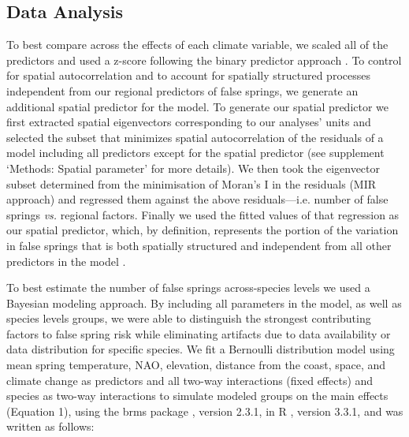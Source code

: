 \documentclass{article}\usepackage[]{graphicx}\usepackage[]{color}
\begin{document}
\subsection*{Data Analysis}
To best compare across the effects of each climate variable, we scaled all of the predictors and used a z-score following the binary predictor approach \citep{Gelman2006}. To control for spatial autocorrelation and to account for spatially structured processes independent from our regional predictors of false springs, we generate an additional spatial predictor for the model. To generate our spatial predictor we first extracted spatial eigenvectors corresponding to our analyses' units and selected the subset that minimizes spatial autocorrelation of the residuals of a model including all predictors except for the spatial predictor \citep{diniz2012selection,Baumen2017} (see supplement `Methods: Spatial parameter' for more details). We then took the eigenvector subset determined from the minimisation of Moran's I in the residuals (MIR approach) and regressed them against the above residuals---i.e. number of false springs \emph{vs.} regional factors. Finally we used the fitted values of that regression as our spatial predictor, which, by definition, represents the portion of the variation in false springs that is both spatially structured and independent from all other predictors in the model \citep[e.g. average spring temperature, altitude, etc.][]{griffith2006spatial,morales2012imprint}. %


To best estimate the number of false springs across-species levels we used a Bayesian modeling approach. By including all parameters in the model, as well as species levels groups, we were able to distinguish the strongest contributing factors to false spring risk while eliminating artifacts due to data availability or data distribution for specific species. We fit a Bernoulli distribution model using mean spring temperature, NAO, elevation, distance from the coast, space, and climate change as predictors and all two-way interactions (fixed effects) and species as two-way interactions to simulate modeled groups on the main effects (Equation 1), using the brms package \citep{brms}, version 2.3.1,  in R \citep{R}, version 3.3.1, and was written as follows:
\end{document}
